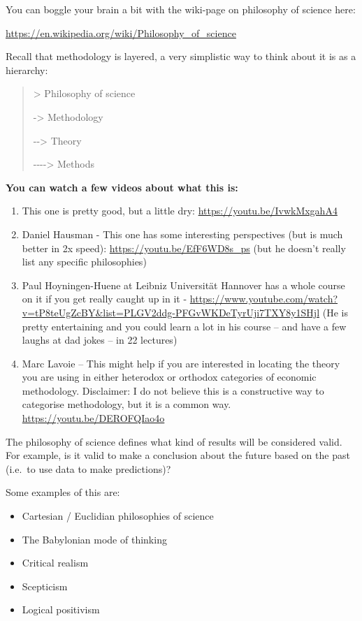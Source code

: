 \documentclass[
]{book}
\begin{document}
You can boggle your brain a bit with the wiki-page on philosophy of
science here:

\url{https://en.wikipedia.org/wiki/Philosophy_of_science}

Recall that methodology is layered, a very simplistic way to think about it is
as a hierarchy:

\begin{quote}
\textgreater{} Philosophy of science

-\textgreater{} Methodology

-\/-\textgreater{} Theory

-\/-\/-\/-\textgreater{} Methods
\end{quote}

\textbf{You can watch a few videos about what this is:}

\begin{enumerate}
\def\labelenumi{\arabic{enumi}.}
\item
  This one is pretty good, but a little dry:
  \url{https://youtu.be/IvwkMxgahA4}
\item
  Daniel Hausman - This one has some interesting perspectives (but is
  much better in 2x speed): \url{https://youtu.be/EfF6WD8s_ps} (but he
  doesn't really list any specific philosophies)
\item
  Paul Hoyningen-Huene at Leibniz Universität Hannover has a whole
  course on it if you get really caught up in it -
  \url{https://www.youtube.com/watch?v=tP8teUgZcBY\&list=PLGV2ddg-PFGvWKDeTyrUji7TXY8y1SHjl}
  (He is pretty entertaining and you could learn a lot in his course
  -- and have a few laughs at dad jokes -- in 22 lectures)
\item
  Marc Lavoie -- This might help if you are interested in locating the theory you are using in either heterodox or orthodox categories of economic methodology. Disclaimer: I do not believe this is a constructive way to categorise methodology, but it is a common way.
  \url{https://youtu.be/DEROFQIao4o}
\end{enumerate}

The philosophy of science defines what kind of results will be
considered valid. For example, is it valid to make a conclusion about
the future based on the past (i.e.~to use data to make predictions)?

Some examples of this are:

\begin{itemize}
\item
  Cartesian / Euclidian philosophies of science
\item
  The Babylonian mode of thinking
\item
  Critical realism
\item
  Scepticism
\item
  Logical positivism
\end{itemize}
\end{document}

